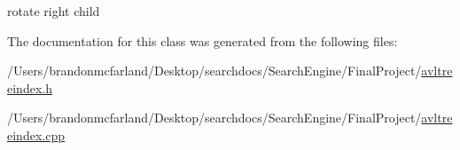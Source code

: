 rotate right child 



The documentation for this class was generated from the following files\+:\begin{DoxyCompactItemize}
\item 
/\+Users/brandonmcfarland/\+Desktop/searchdocs/\+Search\+Engine/\+Final\+Project/\hyperlink{avltreeindex_8h}{avltreeindex.\+h}\item 
/\+Users/brandonmcfarland/\+Desktop/searchdocs/\+Search\+Engine/\+Final\+Project/\hyperlink{avltreeindex_8cpp}{avltreeindex.\+cpp}\end{DoxyCompactItemize}
